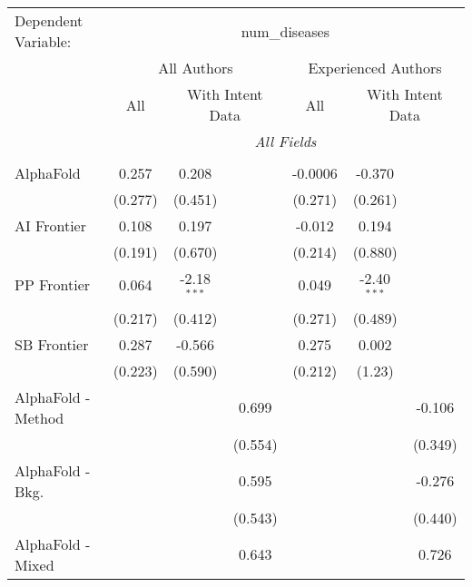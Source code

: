 \begingroup
\centering
\begin{tabular}{lcccccc}
   \tabularnewline \midrule \midrule
   Dependent Variable: & \multicolumn{6}{c}{num\_diseases}\\
 & \multicolumn{3}{c}{All Authors} & \multicolumn{3}{c}{Experienced Authors} \\
\cmidrule(lr){2-4} \cmidrule(lr){5-7}
 & \multicolumn{1}{c}{All} & \multicolumn{2}{c}{With Intent Data} & \multicolumn{1}{c}{All} & \multicolumn{2}{c}{With Intent Data} \\
\cmidrule(lr){2-2} \cmidrule(lr){3-4} \cmidrule(lr){5-5} \cmidrule(lr){6-7}
 & \multicolumn{6}{c}{\textit{All Fields}} \\ \\
   AlphaFold            & 0.257   & 0.208         &               & -0.0006 & -0.370        &   \\   
                        & (0.277) & (0.451)       &               & (0.271) & (0.261)       &   \\   
   AI Frontier          & 0.108   & 0.197         &               & -0.012  & 0.194         &   \\   
                        & (0.191) & (0.670)       &               & (0.214) & (0.880)       &   \\   
   PP Frontier          & 0.064   & -2.18$^{***}$ &               & 0.049   & -2.40$^{***}$ &   \\   
                        & (0.217) & (0.412)       &               & (0.271) & (0.489)       &   \\   
   SB Frontier          & 0.287   & -0.566        &               & 0.275   & 0.002         &   \\   
                        & (0.223) & (0.590)       &               & (0.212) & (1.23)        &   \\   
   AlphaFold - Method   &         &               & 0.699         &         &               & -0.106\\   
                        &         &               & (0.554)       &         &               & (0.349)\\   
   AlphaFold - Bkg.     &         &               & 0.595         &         &               & -0.276\\   
                        &         &               & (0.543)       &         &               & (0.440)\\   
   AlphaFold - Mixed    &         &               & 0.643         &         &               & 0.726\\   

\end{tabular}
